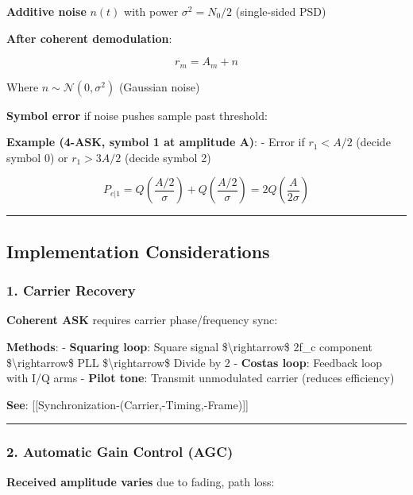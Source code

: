 \textbf{Additive noise} \(n(t)\) with power \(\sigma^2 = N_0/2\)
(single-sided PSD)

\textbf{After coherent demodulation}:

\[
r_m = A_m + n
\]

Where \(n \sim \mathcal{N}(0, \sigma^2)\) (Gaussian noise)

\textbf{Symbol error} if noise pushes sample past threshold:

\textbf{Example (4-ASK, symbol 1 at amplitude A)}: - Error if
\(r_1 < A/2\) (decide symbol 0) or \(r_1 > 3A/2\) (decide symbol 2)

\[
P_{e|1} = Q\left(\frac{A/2}{\sigma}\right) + Q\left(\frac{A/2}{\sigma}\right) = 2Q\left(\frac{A}{2\sigma}\right)
\]

\begin{center}\rule{0.5\linewidth}{0.5pt}\end{center}

\subsection{Implementation
Considerations}\label{implementation-considerations}

\subsubsection{1. Carrier Recovery}\label{carrier-recovery}

\textbf{Coherent ASK} requires carrier phase/frequency sync:

\textbf{Methods}: - \textbf{Squaring loop}: Square signal
\$\textbackslash rightarrow\$ 2f\_c component
\$\textbackslash rightarrow\$ PLL \$\textbackslash rightarrow\$ Divide
by 2 - \textbf{Costas loop}: Feedback loop with I/Q arms - \textbf{Pilot
tone}: Transmit unmodulated carrier (reduces efficiency)

\textbf{See}: {[}{[}Synchronization-(Carrier,-Timing,-Frame){]}{]}

\begin{center}\rule{0.5\linewidth}{0.5pt}\end{center}

\subsubsection{2. Automatic Gain Control
(AGC)}\label{automatic-gain-control-agc}

\textbf{Received amplitude varies} due to fading, path loss:

